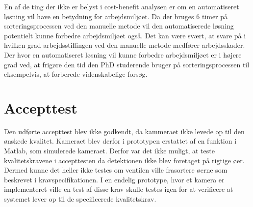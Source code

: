 En af de ting der ikke er belyst i cost-benefit analysen er om en automatiseret løsning vil have en betydning for arbejdsmiljøet. Da der bruges 6 timer på sorteringsprocessen ved den manuelle metode vil den automatiserede løsning potentielt kunne forbedre arbejdsmiljøet også. Det kan være svært, at svare på i hvilken grad arbejdsstillingen ved den manuelle metode medfører arbejdsskader. Der hvor en automatiseret løsning vil kunne forbedre arbejdsmiljøet er i højere grad ved, at frigøre den tid den PhD studerende bruger på sorteringsprocessen til eksempelvis, at forberede videnskabelige forsøg.

\section{Accepttest}
Den udførte accepttest blev ikke godkendt, da kammeraet ikke levede op til den ønskede kvalitet. Kameraet blev derfor i prototypen erstattet af en funktion i Matlab, som simulerede kameraet. Derfor var det ikke muligt, at teste kvalitetskravene i accepttesten da detektionen ikke blev foretaget på rigtige øer. Dermed kunne det heller ikke testes om ventilen ville frasortere øerne som beskrevet i kravspecifikationen. I en endelig prototype, hvor et kamera er implementeret ville en test af disse krav skulle testes igen for at verificere at systemet lever op til de specificerede kvalitetskrav. 